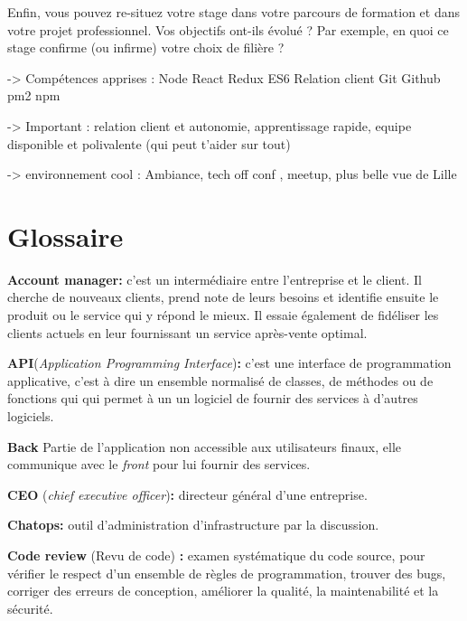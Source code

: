 Enfin, vous pouvez re-situez votre stage dans votre parcours de
formation et dans votre projet professionnel. Vos objectifs ont-ils
évolué ? Par exemple, en quoi ce stage confirme (ou infirme) votre choix
de filière ?

-\textgreater{} Compétences apprises : Node React Redux ES6 Relation
client Git Github pm2 npm

-\textgreater{} Important : relation client et autonomie, apprentissage
rapide, equipe disponible et polivalente (qui peut t'aider sur tout)

-\textgreater{} environnement cool : Ambiance, tech off conf , meetup,
plus belle vue de Lille

\newpage

\section{Glossaire}\label{glossaire}

\textbf{Account manager:} c'est un intermédiaire entre l'entreprise et
le client. Il cherche de nouveaux clients, prend note de leurs besoins
et identifie ensuite le produit ou le service qui y répond le mieux. Il
essaie également de fidéliser les clients actuels en leur fournissant un
service après-vente optimal.

\bigskip

\textbf{API}(\emph{Application Programming Interface})\textbf{:} c'est
une interface de programmation applicative, c'est à dire un ensemble
normalisé de classes, de méthodes ou de fonctions qui qui permet à un un
logiciel de fournir des services à d'autres logiciels.

\bigskip

\textbf{Back} Partie de l'application non accessible aux utilisateurs
finaux, elle communique avec le \emph{front} pour lui fournir des
services.

\bigskip

\textbf{CEO} (\emph{chief executive officer})\textbf{:} directeur
général d'une entreprise.

\bigskip

\textbf{Chatops:} outil d'administration d'infrastructure par la
discussion.

\bigskip

\textbf{Code review} (Revu de code) \textbf{:} examen systématique du
code source, pour vérifier le respect d'un ensemble de règles de
programmation, trouver des bugs, corriger des erreurs de conception,
améliorer la qualité, la maintenabilité et la sécurité.

